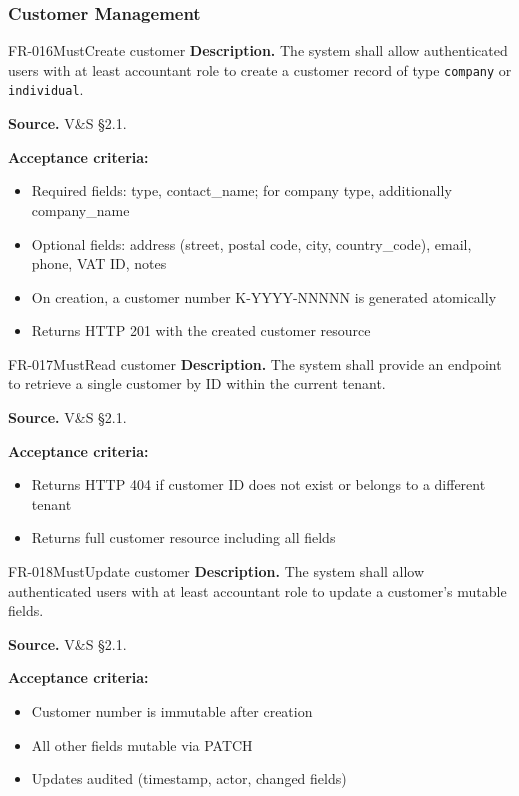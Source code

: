\documentclass[11pt,a4paper]{article}
\begin{document}
\subsubsection{Customer Management}

\begin{requirement}{FR-016}{Must}{Create customer}
\textbf{Description.} The system shall allow authenticated users with at least accountant role to create a customer record of type \texttt{company} or \texttt{individual}.

\textbf{Source.} V\&S \S2.1.

\textbf{Acceptance criteria:}
\begin{itemize}
    \item Required fields: type, contact\_name; for company type, additionally company\_name
    \item Optional fields: address (street, postal code, city, country\_code), email, phone, VAT ID, notes
    \item On creation, a customer number K-YYYY-NNNNN is generated atomically
    \item Returns HTTP 201 with the created customer resource
\end{itemize}
\end{requirement}

\begin{requirement}{FR-017}{Must}{Read customer}
\textbf{Description.} The system shall provide an endpoint to retrieve a single customer by ID within the current tenant.

\textbf{Source.} V\&S \S2.1.

\textbf{Acceptance criteria:}
\begin{itemize}
    \item Returns HTTP 404 if customer ID does not exist or belongs to a different tenant
    \item Returns full customer resource including all fields
\end{itemize}
\end{requirement}

\begin{requirement}{FR-018}{Must}{Update customer}
\textbf{Description.} The system shall allow authenticated users with at least accountant role to update a customer's mutable fields.

\textbf{Source.} V\&S \S2.1.

\textbf{Acceptance criteria:}
\begin{itemize}
    \item Customer number is immutable after creation
    \item All other fields mutable via PATCH
    \item Updates audited (timestamp, actor, changed fields)
\end{itemize}
\end{requirement}
\end{document}
